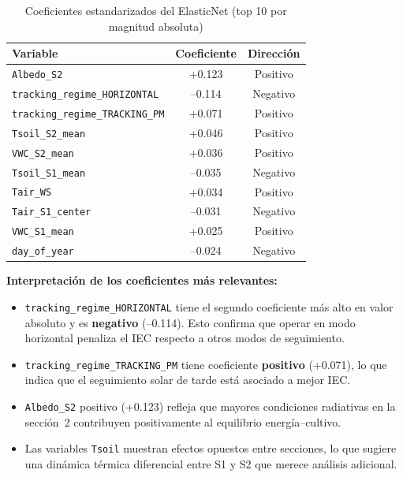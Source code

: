 \documentclass[12pt,a4paper]{article}
\begin{document}
\begin{table}[H]
\centering
\caption{Coeficientes estandarizados del ElasticNet (top 10 por magnitud absoluta)}
\label{tab:coef}
\begin{tabular}{lcc}
\toprule
\textbf{Variable} & \textbf{Coeficiente} & \textbf{Dirección} \\
\midrule
\texttt{Albedo\_S2}                      & +0.123 & Positivo \\
\texttt{tracking\_regime\_HORIZONTAL}    & --0.114 & Negativo \\
\texttt{tracking\_regime\_TRACKING\_PM}  & +0.071 & Positivo \\
\texttt{Tsoil\_S2\_mean}                 & +0.046 & Positivo \\
\texttt{VWC\_S2\_mean}                   & +0.036 & Positivo \\
\texttt{Tsoil\_S1\_mean}                 & --0.035 & Negativo \\
\texttt{Tair\_WS}                        & +0.034 & Positivo \\
\texttt{Tair\_S1\_center}                & --0.031 & Negativo \\
\texttt{VWC\_S1\_mean}                   & +0.025 & Positivo \\
\texttt{day\_of\_year}                   & --0.024 & Negativo \\
\bottomrule
\end{tabular}
\end{table}

\textbf{Interpretación de los coeficientes más relevantes:}

\begin{itemize}
    \item \texttt{tracking\_regime\_HORIZONTAL} tiene el segundo coeficiente más alto en
        valor absoluto y es \textbf{negativo} (--0.114). Esto confirma que operar en
        modo horizontal penaliza el IEC respecto a otros modos de seguimiento.

    \item \texttt{tracking\_regime\_TRACKING\_PM} tiene coeficiente \textbf{positivo}
        (+0.071), lo que indica que el seguimiento solar de tarde está asociado a mejor
        IEC.

    \item \texttt{Albedo\_S2} positivo (+0.123) refleja que mayores condiciones
        radiativas en la sección~2 contribuyen positivamente al equilibrio
        energía--cultivo.

    \item Las variables \texttt{Tsoil} muestran efectos opuestos entre secciones, lo que
        sugiere una dinámica térmica diferencial entre S1 y S2 que merece análisis
        adicional.
\end{itemize}
\end{document}
